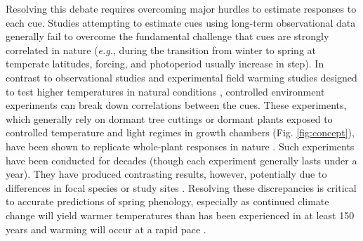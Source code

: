 \documentclass{article}
\begin{document}
\par Resolving this debate requires overcoming major hurdles to estimate responses to each cue. Studies attempting to estimate cues using long-term observational data \emph{\citep[e.g.,][]{zohner2016,vitasse2013}} generally fail to overcome the fundamental challenge that cues are strongly correlated in nature (\emph{e.g.}, during the transition from winter to spring at temperate latitudes, forcing, and photoperiod usually increase in step). In contrast to observational studies and experimental field warming studies designed to test higher temperatures in natural conditions \emph{\citep{Wolkovich:2012n}}, controlled environment experiments can break down correlations between the cues. These experiments, which generally rely on dormant tree cuttings or dormant plants exposed to controlled temperature and light regimes in growth chambers (Fig. \ref{fig:concept}), have been shown to replicate whole-plant responses in nature \citep{vitasse2014}. Such experiments have been conducted for decades (though each experiment generally lasts under a year). They have produced contrasting results, however, potentially due to differences in focal species or study sites \emph{\citep{zohner2016,Caffarra:2011b,Laube:2014a,Basler:2012,Caffarra:2011a}}. Resolving these discrepancies is critical to accurate predictions of spring phenology, especially as continued climate change will yield warmer temperatures than has been experienced in at least 150 years and warming will occur at a rapid pace \emph{\citep{ohlemuller2006,williams2007,williams2007b,ipcc2013,xu2018}}.

\end{document}
